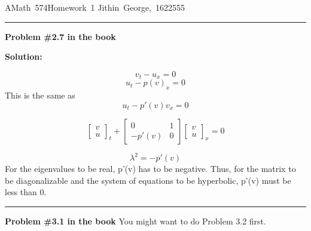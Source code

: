 \documentclass[11pt]{article}
\begin{document}
\hfill\vbox{\hbox{AMath 574}\hbox{Homework 1}
\hbox{Jithin George, 1622555}}



\vskip 1cm
\hrule
{\bf Problem \#2.7 in the book}


\vskip 1cm
{\bf Solution:}

\[ v_t - u_x=0 \]
\[ u_t - {p(v)}_x=0 \]
This is the same as
\[ u_t - p'(v)v_x=0 \]



	\[
	\begin{bmatrix}
	v\\
	u
	\end{bmatrix}_t +\begin{bmatrix}	0 & 1 \\ - p'(v) &0 \end{bmatrix} 	\begin{bmatrix}	v\\ u \end{bmatrix}_x =0 \]
	
\[\lambda^2 = - p'(v)\]
For the eigenvalues to be real, p'(v) has to be negative.
Thus, for the matrix to be diagonalizable and the system of equations to be hyperbolic,  p'(v) must be less than 0.

\vskip 1cm
\hrule
{\bf Problem \#3.1 in the book} You might want to do Problem 3.2 first.
\end{document}

